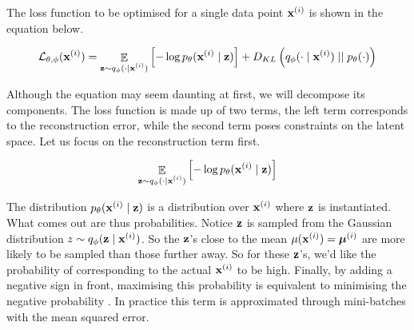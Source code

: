 	The loss function to be optimised for a single data point $\mathbf{x}^{(i)}$ is shown in the equation below.
	
	\begin{equation}
		\mathcal{L}_{\theta, \phi} (\mathbf{x}^{(i)}) = \mathop{\mathbb{E}}_{\substack{\mathbf{z} \sim q_\phi (\cdot \mid \mathbf{x}^{(i)})}} \left[ -\log p_\theta (\mathbf{x}^{(i)} \mid \mathbf{z}) \right] + D_{KL} \left(  q_\phi (\cdot \mid \mathbf{x}^{(i)})  \mid \mid  p_\theta(\cdot)  \right) \label{eq:elbo_explicit_intial}
	\end{equation} %
	
	Although the equation may seem daunting at first, we will decompose its components. The loss function is made up of two terms, the left term corresponds to the reconstruction error, while the second term poses constraints on the latent space. Let us focus on the reconstruction term first.
	
	$$
	\mathop{\mathbb{E}}_{\substack{\mathbf{z} \sim q_\phi (\cdot \mid \mathbf{x}^{(i)})}} \left[ -\log p_\theta (\mathbf{x}^{(i)} \mid \mathbf{z}) \right]
	$$
	
	The distribution $p_\theta (\mathbf{x}^{(i)} \mid \mathbf{z})$ is a distribution over $\mathbf{x}^{(i)}$ where $\mathbf{z}$ is instantiated. What comes out are thus probabilities. Notice $\mathbf{z}$ is sampled from the Gaussian distribution $z \sim q_\phi (\mathbf{z} \mid \mathbf{x}^{(i)})$. So the $\mathbf{z}$'s close to the mean $\mu(\mathbf{x}^{(i)}) = \bm{\mu}^{(i)}$ are more likely to be sampled than those further away. So for these $\mathbf{z}$'s, we'd like the probability of corresponding to the actual $\mathbf{x}^{(i)}$ to be high. Finally, by adding a negative sign in front, maximising this probability is equivalent to minimising the negative probability \cite{cinelliVariationalMethodsMachine2021}. %
	In practice this term is approximated through mini-batches with the mean squared error. %
	
